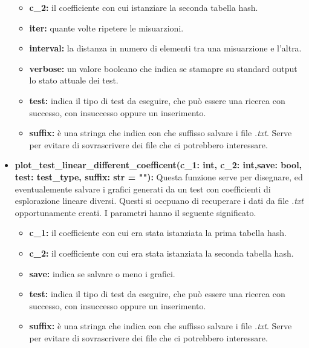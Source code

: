 \documentclass{article}
\newcommand{\newlineitem}[1]{\item \textbf{#1} \hfill \break}
\begin{document}
\begin{itemize}
\begin{itemize}
\item \textbf{c\_2:} il coefficiente con cui istanziare la seconda tabella hash.
\item \textbf{iter:} quante volte ripetere le misuarzioni.
\item \textbf{interval:} la distanza in numero di elementi tra una misuarzione e l'altra.
\item \textbf{verbose:} un valore booleano che indica se stamapre su standard output lo stato attuale dei test.
\item \textbf{test:} indica il tipo di test da eseguire, che può essere una ricerca con successo, con insuccesso oppure un inserimento.
\item \textbf{suffix:} è una stringa che indica con che suffisso salvare i file \emph{.txt}. Serve per evitare di sovrascrivere dei file che ci potrebbero interessare.
\end{itemize}
\newlineitem{plot\_test\_linear\_different\_coefficent(c\_1: int, c\_2: int,save: bool, test: test\_type, suffix: str = ""):}
Questa funzione serve per disegnare, ed eventualemente salvare i grafici generati da un test con coefficienti di esplorazione lineare diversi. Questi si occpuano di recuperare i dati da file \emph{.txt} opportunamente creati. I parametri hanno il seguente significato.
\begin{itemize}
\item \textbf{c\_1:} il coefficiente con cui era stata istanziata la prima tabella hash.
\item \textbf{c\_2:} il coefficiente con cui era stata istanziata la seconda tabella hash.
\item \textbf{save:} indica se salvare o meno i grafici.
\item \textbf{test:} indica il tipo di test da eseguire, che può essere una ricerca con successo, con insuccesso oppure un inserimento.
\item \textbf{suffix:} è una stringa che indica con che suffisso salvare i file \emph{.txt}. Serve per evitare di sovrascrivere dei file che ci potrebbero interessare.
\end{itemize}


\end{itemize}
\end{document}

